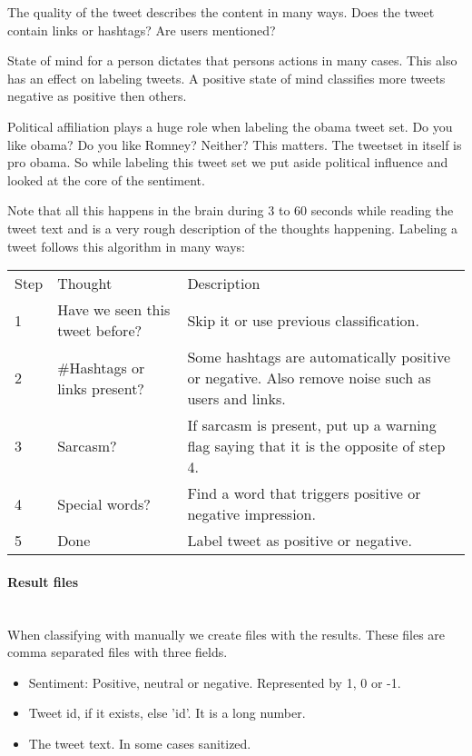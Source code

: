 The quality of the tweet describes the content in many ways. Does the tweet
contain links or hashtags? Are users mentioned?

State of mind for a person dictates that persons actions in many cases. This
also has an effect on labeling tweets. A positive state of mind classifies more
tweets negative as positive then others.

Political affiliation plays a huge role when labeling the obama tweet set. Do
you like obama? Do you like Romney? Neither? This matters. The tweetset in
itself is pro obama. So while labeling this tweet set we put aside political
influence and looked at the core of the sentiment.

Note that all this happens in the brain during 3 to 60 seconds while reading
the tweet text and is a very rough description of the thoughts happening.
Labeling a tweet follows this algorithm in many ways:

\begin{tabular}{ l p{5cm} p{7cm} }
Step & Thought & Description \\
1 & Have we seen this tweet before? & Skip it or use previous classification. \\
2 & \#Hashtags or links present? & Some hashtags are automatically positive or
negative. Also remove noise such as users and links.\\
3 & Sarcasm? & If sarcasm is present, put up a warning flag saying that it is
the opposite of step 4.\\
4 & Special words? & Find a word that triggers positive or negative
impression.\\
5 & Done & Label tweet as positive or negative.\\
\end{tabular}

\paragraph{Result files}
\hspace{0pt}\\
When classifying with manually we create files with the results. These files
are comma separated files with three fields.
\begin{itemize}
    \item Sentiment: Positive, neutral or negative. Represented by 1, 0 or -1.
    \item Tweet id, if it exists, else 'id'. It is a long number.
    \item The tweet text. In some cases sanitized.
\end{itemize}

